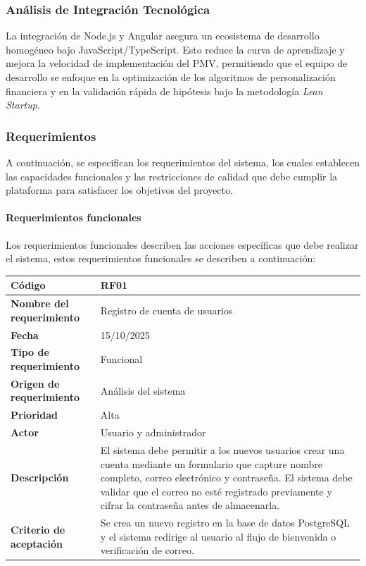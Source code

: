 \subsubsection*{Análisis de Integración Tecnológica}
La integración de Node.js y Angular asegura un ecosistema de desarrollo homogéneo bajo JavaScript/TypeScript. Esto reduce la curva de aprendizaje y mejora la velocidad de implementación del PMV, permitiendo que el equipo de desarrollo se enfoque en la optimización de los algoritmos de personalización financiera y en la validación rápida de hipótesis bajo la metodología \textit{Lean Startup}.

\subsubsection*{Requerimientos}
A continuación, se especifican los requerimientos del sistema, los cuales establecen las capacidades funcionales y las restricciones de calidad que debe cumplir la plataforma para satisfacer los objetivos del proyecto.

\paragraph*{Requerimientos funcionales}
Los requerimientos funcionales describen las acciones específicas que debe realizar el sistema, estos requerimientos funcionales se describen a continuación:

\begin{table}[H]
	\begin{tabular}{|a{5cm}|m{11cm}|}
		\hline
		\textbf{Código} & RF01 \\ \hline
		\textbf{Nombre del requerimiento} & Registro de cuenta de usuarios \\ \hline
		\textbf{Fecha} & 15/10/2025 \\ \hline
		\textbf{Tipo de requerimiento} & Funcional \\ \hline
		\textbf{Origen de requerimiento} & Análisis del sistema \\ \hline
		\textbf{Prioridad} & Alta \\ \hline
		\textbf{Actor} & Usuario y administrador \\ \hline
		\textbf{Descripción} & El sistema debe permitir a los nuevos usuarios crear una cuenta mediante un formulario que capture nombre completo, correo electrónico y contraseña. El sistema debe validar que el correo no esté registrado previamente y cifrar la contraseña antes de almacenarla.\\ \hline
		\textbf{Criterio de aceptación} & Se crea un nuevo registro en la base de datos PostgreSQL y el sistema redirige al usuario al flujo de bienvenida o verificación de correo. \\ \hline
	\end{tabular}
\end{table}

